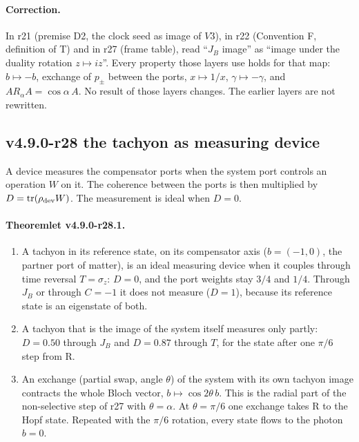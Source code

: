 \paragraph{Correction.}
In r21 (premise D2, the clock seed as image of \(V3\)), in r22 (Convention F, definition of T) and in r27 (frame table), read
``\(J_B\) image'' as ``image under the duality rotation \(z\mapsto iz\)''.  Every property those layers use holds for that map: \(b\mapsto-b\),
exchange of \(p_\pm\) between the ports, \(x\mapsto1/x\), \(\gamma\mapsto-\gamma\), and \(AR_\alpha A=\cos\alpha\,A\).  No result of those
layers changes.  The earlier layers are not rewritten.

\subsection*{v4.9.0-r28 the tachyon as measuring device}
\label{subsec:v490-r28-tachyon-meter}

A device measures the compensator ports when the system port controls an operation \(W\) on it.  The coherence between the ports
is then multiplied by \(D=\operatorname{tr}(\rho_{\rm dev}W)\).  The measurement is ideal when \(D=0\).

\paragraph{Theoremlet v4.9.0-r28.1.}
\begin{enumerate}[leftmargin=2em]
\item[(a)] A tachyon in its reference state, on its compensator axis (\(b=(-1,0)\), the partner port of matter), is an ideal measuring
device when it couples through time reversal \(T=\sigma_z\): \(D=0\), and the port weights stay \(3/4\) and \(1/4\).  Through \(J_B\) or
through \(C=-1\) it does not measure (\(D=1\)), because its reference state is an eigenstate of both.
\item[(b)] A tachyon that is the image of the system itself measures only partly: \(D=0.50\) through \(J_B\) and \(D=0.87\) through \(T\),
for the state after one \(\pi/6\) step from R.
\item[(c)] An exchange (partial swap, angle \(\theta\)) of the system with its own tachyon image contracts the whole Bloch vector,
\(b\mapsto\cos2\theta\,b\).  This is the radial part of the non-selective step of r27 with \(\theta=\alpha\).  At \(\theta=\pi/6\) one exchange
takes R to the Hopf state.  Repeated with the \(\pi/6\) rotation, every state flows to the photon \(b=0\).
\end{enumerate}

